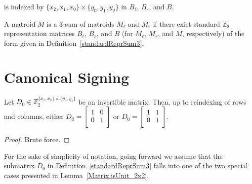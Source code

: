 \begin{definition}
    is indexed by $\{x_{2}, x_{1}, x_{0}\} \times \{y_{0}, y_{1}, y_{2}\}$ in $B_{\ell}$, $B_{r}$, and $B$.
\end{definition}

\begin{definition}
    \label{Matroid.IsSum3of}
    \leanok
    A matroid $M$ is a $3$-sum of matroids $M_{\ell}$ and $M_{r}$ if there exist standard $\mathbb{Z}_{2}$ representation matrices $B_{\ell}$, $B_{r}$, and $B$ (for $M_{\ell}$, $M_{r}$, and $M$, respectively) of the form given in Definition~\ref{standardReprSum3}.
\end{definition}


\section{Canonical Signing}

\begin{lemma}
    \label{Matrix.isUnit_2x2}
    \leanok
    Let $D_{0} \in \mathbb{Z}_{2}^{\{x_{1}, x_{0}\} \times \{y_{0}, y_{1}\}}$ be an invertible matrix. Then, up to reindexing of rows and columns, either $D_{0} = \begin{bmatrix} 1 & 0 \\ 0 & 1 \\ \end{bmatrix}$ or $D_{0} = \begin{bmatrix} 1 & 1 \\ 0 & 1 \\ \end{bmatrix}$.
\end{lemma}

\begin{proof}
    \leanok
    Brute force.
\end{proof}

For the sake of simplicity of notation, going forward we assume that the submatrix $D_{0}$ in Definition~\ref{standardReprSum3} falls into one of the two special cases presented in Lemma~\ref{Matrix.isUnit_2x2}.

